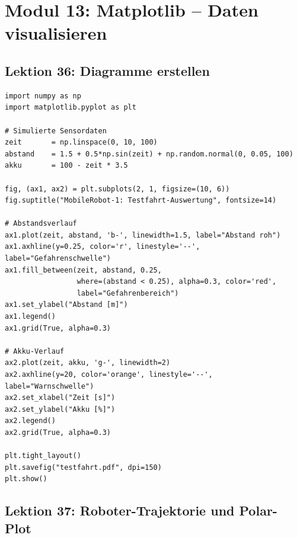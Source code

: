 \chapter{Modul 13: Matplotlib -- Daten visualisieren}

\section{Lektion 36: Diagramme erstellen}

\begin{lstlisting}
import numpy as np
import matplotlib.pyplot as plt

# Simulierte Sensordaten
zeit       = np.linspace(0, 10, 100)
abstand    = 1.5 + 0.5*np.sin(zeit) + np.random.normal(0, 0.05, 100)
akku       = 100 - zeit * 3.5

fig, (ax1, ax2) = plt.subplots(2, 1, figsize=(10, 6))
fig.suptitle("MobileRobot-1: Testfahrt-Auswertung", fontsize=14)

# Abstandsverlauf
ax1.plot(zeit, abstand, 'b-', linewidth=1.5, label="Abstand roh")
ax1.axhline(y=0.25, color='r', linestyle='--', label="Gefahrenschwelle")
ax1.fill_between(zeit, abstand, 0.25,
                 where=(abstand < 0.25), alpha=0.3, color='red',
                 label="Gefahrenbereich")
ax1.set_ylabel("Abstand [m]")
ax1.legend()
ax1.grid(True, alpha=0.3)

# Akku-Verlauf
ax2.plot(zeit, akku, 'g-', linewidth=2)
ax2.axhline(y=20, color='orange', linestyle='--', label="Warnschwelle")
ax2.set_xlabel("Zeit [s]")
ax2.set_ylabel("Akku [%]")
ax2.legend()
ax2.grid(True, alpha=0.3)

plt.tight_layout()
plt.savefig("testfahrt.pdf", dpi=150)
plt.show()
\end{lstlisting}

\section{Lektion 37: Roboter-Trajektorie und Polar-Plot}

